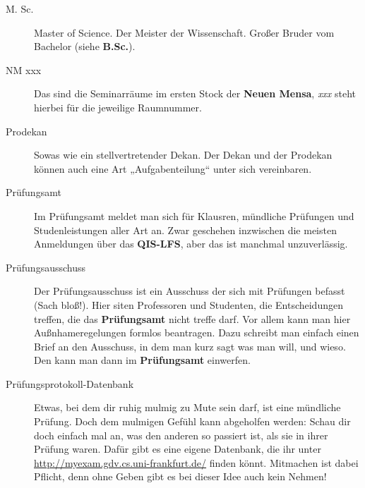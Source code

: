 \begin{description}
\item[M. Sc.] Master of Science. Der Meister der Wissenschaft. Großer
Bruder vom Bachelor (siehe \textbf{B.Sc.}).


\item[NM xxx] Das sind die Seminarräume im ersten Stock der
\textbf{Neuen Mensa}, \textsl{xxx} steht hierbei für die jeweilige
Raumnummer.




\item[Prodekan] Sowas wie ein stellvertretender Dekan. Der Dekan und
der Prodekan können auch eine Art „Aufgabenteilung“ unter sich
vereinbaren.


\item[Prüfungsamt] Im Prüfungsamt meldet man sich für Klausren, mündliche Prüfungen und Studenleistungen aller Art an.
Zwar geschehen inzwischen die meisten Anmeldungen über das \textbf{QIS-LFS}, aber das ist manchmal unzuverlässig.


\item[Prüfungsausschuss] Der Prüfungsausschuss ist ein Ausschuss der sich mit
Prüfungen befasst (Sach bloß!). Hier siten Professoren und Studenten, die
Entscheidungen treffen, die das \textbf{Prüfungsamt} nicht treffe darf.  Vor
allem kann man hier Außnhameregelungen formlos beantragen. Dazu schreibt man
einfach einen Brief an den Ausschuss, in dem man kurz sagt was man will, und
wieso. Den kann man dann im \textbf{Prüfungsamt} einwerfen.


\item[Prüfungsprotokoll-Datenbank] Etwas, bei dem dir ruhig mulmig zu
Mute sein darf, ist eine mündliche Prüfung. Doch dem mulmigen Gefühl
kann abgeholfen werden: Schau dir doch einfach mal an, was den anderen
so passiert ist, als sie in ihrer Prüfung waren. Dafür gibt es eine
eigene Datenbank, die ihr unter
\url{http://myexam.gdv.cs.uni-frankfurt.de/} finden könnt. Mitmachen
ist dabei Pflicht, denn ohne Geben gibt es bei dieser Idee auch kein
Nehmen!




\end{description}
